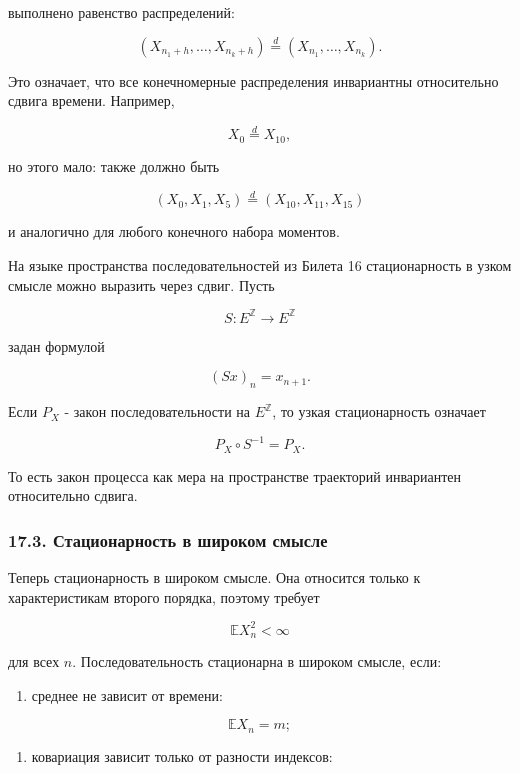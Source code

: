 \documentclass[
  11pt,
  a4paper,
]{article}
\providecommand{\tightlist}{%
  \setlength{\itemsep}{0pt}\setlength{\parskip}{0pt}}
\begin{document}
выполнено равенство распределений:

\[
(X_{n_1+h},\ldots,X_{n_k+h})
\stackrel d=
(X_{n_1},\ldots,X_{n_k}).
\]

Это означает, что все конечномерные распределения инвариантны
относительно сдвига времени. Например,

\[
X_0\stackrel d=X_{10},
\]

но этого мало: также должно быть

\[
(X_0,X_1,X_5)\stackrel d=(X_{10},X_{11},X_{15})
\]

и аналогично для любого конечного набора моментов.

На языке пространства последовательностей из Билета 16 стационарность в
узком смысле можно выразить через сдвиг. Пусть

\[
S:E^{\mathbb Z}\to E^{\mathbb Z}
\]

задан формулой

\[
(Sx)_n=x_{n+1}.
\]

Если \(P_X\) - закон последовательности на \(E^{\mathbb Z}\), то узкая
стационарность означает

\[
P_X\circ S^{-1}=P_X.
\]

То есть закон процесса как мера на пространстве траекторий инвариантен
относительно сдвига.

\subsubsection{17.3. Стационарность в широком
смысле}\label{ux441ux442ux430ux446ux438ux43eux43dux430ux440ux43dux43eux441ux442ux44c-ux432-ux448ux438ux440ux43eux43aux43eux43c-ux441ux43cux44bux441ux43bux435}

Теперь стационарность в широком смысле. Она относится только к
характеристикам второго порядка, поэтому требует

\[
\mathbb E X_n^2<\infty
\]

для всех \(n\). Последовательность стационарна в широком смысле, если:

\begin{enumerate}
\def\labelenumi{\arabic{enumi}.}
\tightlist
\item
  среднее не зависит от времени:
\end{enumerate}

\[
\mathbb E X_n=m;
\]

\begin{enumerate}
\def\labelenumi{\arabic{enumi}.}
\setcounter{enumi}{1}
\tightlist
\item
  ковариация зависит только от разности индексов:
\end{enumerate}
\end{document}

